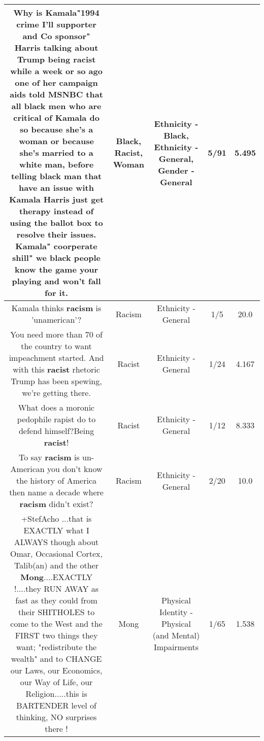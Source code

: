 \documentclass[11pt]{article}
\newlength\mylength
\begin{document}
\begin{center}
\begin{longtable}{|C{.65\mylength}|C{.30\mylength}|C{.12\mylength}|C{.12\mylength}|C{.12\mylength}|}
  \small Why is Kamala"1994 crime I'll supporter and Co sponsor" Harris talking about Trump being \textbf{racist} while a week or so ago one of her campaign aids told MSNBC that all \textbf{black} men who are critical of Kamala do so because she's a \textbf{woman} or because she's married to a white man, before telling \textbf{black} man that have an issue with Kamala Harris just get therapy instead of using the ballot box to resolve their issues.  Kamala" coorperate shill" we \textbf{black} people know the game your playing and won't fall for it.\normalsize   & Black, Racist, Woman & Ethnicity - Black, Ethnicity - General, Gender - General & 5/91 & 5.495 \\  \hline
  \small Kamala thinks \textbf{racism} is 'unamerican'?\normalsize   & Racism & Ethnicity - General & 1/5 & 20.0 \\  \hline
  \small You need more than 70 of the country to want impeachment started. And with this \textbf{racist} rhetoric Trump has been spewing, we're getting there.\normalsize   & Racist & Ethnicity - General & 1/24 & 4.167 \\  \hline
  \small What does a moronic pedophile rapist do to defend himself?Being \textbf{racist}!\normalsize   & Racist & Ethnicity - General & 1/12 & 8.333 \\  \hline
  \small To say \textbf{racism} is un-American you don't know the history of America then name a decade where \textbf{racism} didn't exist?\normalsize   & Racism & Ethnicity - General & 2/20 & 10.0 \\  \hline
  \small +StefAcho  ...that is EXACTLY what I ALWAYS though about Omar, Occasional Cortex, Talib(an) and the other \textbf{Mong}....EXACTLY !....they RUN AWAY as fast as they could from their SHITHOLES to come to the West and the FIRST two things they want; "redistribute the wealth" and to CHANGE our Laws, our Economics, our Way of Life, our Religion.....this is BARTENDER level of thinking, NO surprises there !\normalsize   & Mong & Physical Identity - Physical (and Mental) Impairments & 1/65 & 1.538 \\  \hline

\end{longtable}
\end{center}
\end{document}
